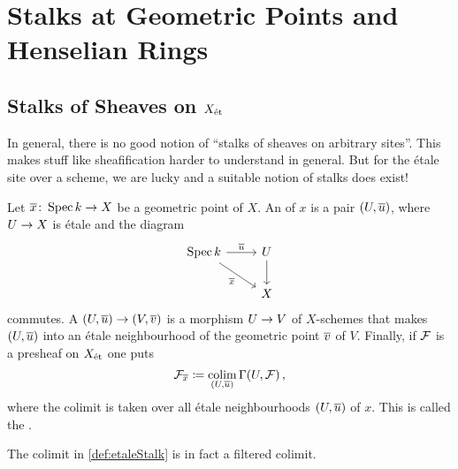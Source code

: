 \section{Stalks at Geometric Points and Henselian Rings}\label{sec:Stalks}
\subsection{Stalks of Sheaves on \texorpdfstring{$X_{\mathrm{\acute{e}t}}$}{Xet}}
In general, there is no good notion of \enquote{stalks of sheaves on arbitrary sites}. This makes stuff like sheafification harder to understand in general. But for the étale site over a scheme, we are lucky and a suitable notion of stalks does exist!

\begin{defi}\label{def:etaleStalk}
	Let $\ov{x}\colon \Spec k\morphism X$ be a geometric point of $X$. An  of $x$ is a pair $(U,\ov{u})$, where $U\morphism X$ is étale and the diagram
	\begin{equation*}
		\begin{tikzcd}
			\Spec k\rar["\ov{u}"]\drar["\ov{x}"{swap}]& U\dar\\
			 & X\end{tikzcd}
	\end{equation*}
	commutes. A  $(U,\ov{u})\morphism(V,\ov{v})$ is a morphism $U\morphism V$ of $X$-schemes that makes $(U,\ov{u})$ into an étale neighbourhood of the geometric point $\ov{v}$ of $V$. Finally, if $\mathcal{F}$ is a presheaf on $X_{\mathrm{\acute{e}t}}$ one puts
	\begin{equation*}
		\Ff_{\ov{x}}\coloneqq \colimit_{(U,\ov{u})}\Global(U,\Ff)\,,
	\end{equation*}
	where the colimit is taken over all étale neighbourhoods $(U,\ov{u})$ of $x$. This is called the .
\end{defi}
\begin{fact}\label{fact:filtered}
	The colimit in \cref{def:etaleStalk} is in fact a filtered colimit.
\end{fact}
